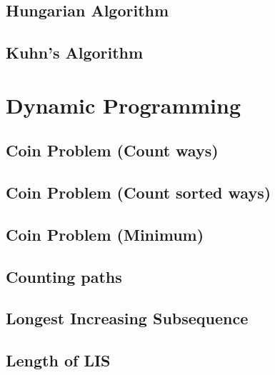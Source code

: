 \documentclass[10pt]{article}
\begin{document}
\begin{multicols*}{2}
\subsection{Hungarian Algorithm}


\subsection{Kuhn's Algorithm}



\section{Dynamic Programming}

\subsection{Coin Problem (Count ways)}


\subsection{Coin Problem (Count sorted ways)}


\subsection{Coin Problem (Minimum)}


\subsection{Counting paths}


\subsection{Longest Increasing Subsequence}


\subsection{Length of LIS}



\end{multicols*}
\end{document}
